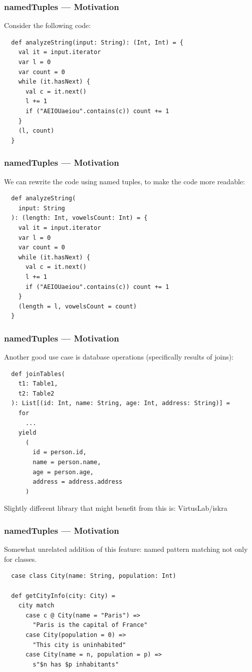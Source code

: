 \documentclass{beamer}
\begin{document}
\begin{frame}[fragile]
  \frametitle{namedTuples --- Motivation}

  Consider the following code:

  \begin{lstlisting}
  def analyzeString(input: String): (Int, Int) = {
    val it = input.iterator
    var l = 0
    var count = 0
    while (it.hasNext) {
      val c = it.next()
      l += 1
      if ("AEIOUaeiou".contains(c)) count += 1
    }
    (l, count)
  }
  \end{lstlisting}
  
\end{frame}

\begin{frame}[fragile]
  \frametitle{namedTuples --- Motivation}

  We can rewrite the code using named tuples, to make the code more readable:

  \begin{lstlisting}
  def analyzeString(
    input: String
  ): (length: Int, vowelsCount: Int) = {
    val it = input.iterator
    var l = 0
    var count = 0
    while (it.hasNext) {
      val c = it.next()
      l += 1
      if ("AEIOUaeiou".contains(c)) count += 1
    }
    (length = l, vowelsCount = count)
  }
  \end{lstlisting}

\end{frame}

\begin{frame}[fragile]
  \frametitle{namedTuples --- Motivation}

  Another good use case is database operations (specifically results of joins):

  \begin{lstlisting}
  def joinTables(
    t1: Table1,
    t2: Table2
  ): List[(id: Int, name: String, age: Int, address: String)] =
    for
      ...
    yield
      (
        id = person.id,
        name = person.name,
        age = person.age,
        address = address.address
      )
  \end{lstlisting}

  Slightly different library that might benefit from this is: VirtusLab/iskra

\end{frame}

\begin{frame}[fragile]
  \frametitle{namedTuples --- Motivation}

  Somewhat unrelated addition of this feature: named pattern matching not only for classes.

  \begin{lstlisting}
  case class City(name: String, population: Int)

  def getCityInfo(city: City) =
    city match
      case c @ City(name = "Paris") =>
        "Paris is the capital of France"
      case City(population = 0) =>
        "This city is uninhabited"
      case City(name = n, population = p) =>
        s"$n has $p inhabitants"    
  \end{lstlisting}

\end{frame}
\end{document}
